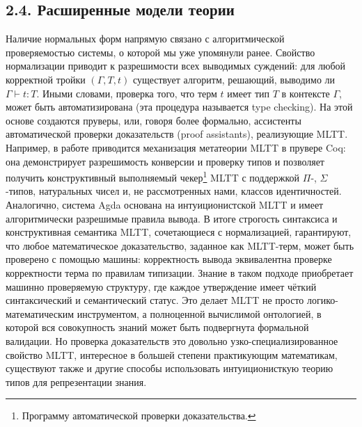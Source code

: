 \documentclass[14pt]{extarticle}
\begin{document}
	\subsection*{2.4. Расширенные модели теории}
	Наличие нормальных форм напрямую связано с алгоритмической проверяемостью системы, о которой мы уже упомянули ранее. Свойство нормализации приводит к разрешимости всех выводимых суждений: для любой корректной тройки \((\Gamma,T,t)\) существует алгоритм, решающий, выводимо ли \(\Gamma\vdash t:T\). Иными словами, проверка того, что терм \(t\) имеет тип \(T\) в контексте \(\Gamma\), может быть автоматизирована (эта процедура называется type checking). На этой основе создаются пруверы, или, говоря более формально, ассистенты автоматической проверки доказательств (proof assistants), реализующие MLTT. Например, в работе \cite{adjedj2023martinlofalacoq} приводится механизация метатеории MLTT в прувере Coq: она демонстрирует разрешимость конверсии и проверку типов и позволяет получить конструктивный выполняемый чекер\footnote{Программу автоматической проверки доказательства.} MLTT с поддержкой \(\Pi\)-, \(\Sigma\)-типов, натуральных чисел и, не рассмотренных нами, классов идентичностей. Аналогично, система Agda основана на интуиционистской MLTT и имеет алгоритмически разрешимые правила вывода. В итоге строгость синтаксиса и конструктивная семантика MLTT, сочетающиеся с нормализацией, гарантируют, что любое математическое доказательство, заданное как MLTT-терм, может быть проверено с помощью машины: корректность вывода эквивалентна проверке корректности терма по правилам типизации. Знание в таком подходе приобретает машинно проверяемую структуру, где каждое утверждение имеет чёткий синтаксический и семантический статус. Это делает MLTT не просто логико-математическим инструментом, а полноценной вычислимой онтологией, в которой вся совокупность знаний может быть подвергнута формальной валидации. Но проверка доказательств это довольно узко-специализированное свойство MLTT, интересное в большей степени практикующим математикам, существуют также и другие способы использовать интуиционисткую теорию типов для репрезентации знания. 
	
\end{document}
